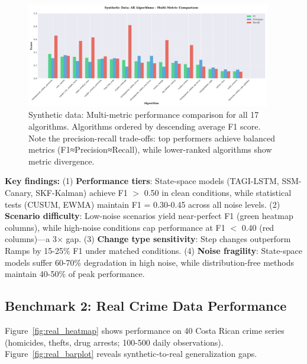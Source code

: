 \begin{figure}[H]
\centering
\includegraphics[width=0.95\textwidth]{figures/fig_synthetic_barplot.pdf}
\caption{Synthetic data: Multi-metric performance comparison for all 17 algorithms. Algorithms ordered by descending average F1 score. Note the precision-recall trade-offs: top performers achieve balanced metrics (F1≈Precision≈Recall), while lower-ranked algorithms show metric divergence.}
\label{fig:synthetic_barplot}
\end{figure}

\textbf{Key findings:} (1) \textbf{Performance tiers}: State-space models (TAGI-LSTM, SSM-Canary, SKF-Kalman) achieve F1 $>$ 0.50 in clean conditions, while statistical tests (CUSUM, EWMA) maintain F1 = 0.30-0.45 across all noise levels. (2) \textbf{Scenario difficulty}: Low-noise scenarios yield near-perfect F1 (green heatmap columns), while high-noise conditions cap performance at F1 $<$ 0.40 (red columns)—a 3× gap. (3) \textbf{Change type sensitivity}: Step changes outperform Ramps by 15-25\% F1 under matched conditions. (4) \textbf{Noise fragility}: State-space models suffer 60-70\% degradation in high noise, while distribution-free methods maintain 40-50\% of peak performance.


\subsection{Benchmark 2: Real Crime Data Performance}
\label{sec:results_real}

Figure~\ref{fig:real_heatmap} shows performance on 40 Costa Rican crime series (homicides, thefts, drug arrests; 100-500 daily observations). Figure~\ref{fig:real_barplot} reveals synthetic-to-real generalization gaps.

